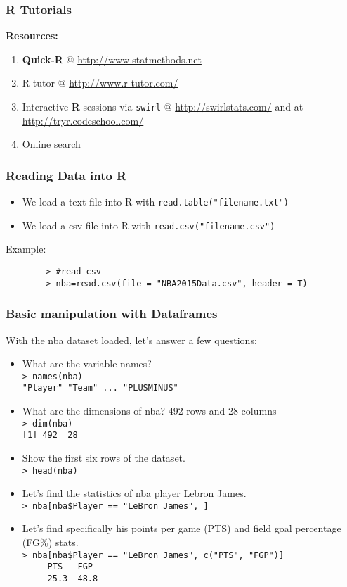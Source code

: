 \documentclass{beamer}
\begin{document}
\begin{frame}[fragile]\frametitle{R Tutorials}
	\textbf{Resources:}
	\begin{enumerate}
		\item \textbf{Quick-R} @ \url{http://www.statmethods.net}
		\item R-tutor @ \url{http://www.r-tutor.com/}
		\item Interactive \textbf{R} sessions via \texttt{swirl} @ \url{http://swirlstats.com/} and at \url{http://tryr.codeschool.com/}
		\item Online search 
	\end{enumerate}	
\end{frame}

\begin{frame}[fragile]\frametitle{Reading Data into R}
	\begin{itemize}
		\item We load a text file into R with \verb|read.table("filename.txt")|
		\item We load a csv file into R with \verb|read.csv("filename.csv")|
	\end{itemize}
	Example:
	\begin{framed}
		\begin{verbatim}
		> #read csv
		> nba=read.csv(file = "NBA2015Data.csv", header = T)
		\end{verbatim}
	\end{framed}
\end{frame}


\begin{frame}[fragile]\frametitle{Basic manipulation with Dataframes}
	With the nba dataset loaded, let's answer a few questions:
\vspace{-10pt}
\small
	\begin{itemize}
		\item What are the variable names?\\
		\verb|> names(nba)|\\
		\verb|"Player" "Team" ... "PLUSMINUS"|
		\item What are the dimensions of nba? 492 rows and 28 columns \\
		\verb|> dim(nba)|\\
		\verb|[1] 492  28|
		\item Show the first six rows of the dataset.\\
		\verb|> head(nba)|
		\item Let's find the statistics of nba player Lebron James.\\
		\verb|> nba[nba$Player == "LeBron James", ]|
		\item Let's find specifically his points per game (PTS) and field goal percentage (FG\%) stats.\\
		\verb|> nba[nba$Player == "LeBron James", c("PTS", "FGP")]|\\
		\verb|     PTS   FGP|\\
		\verb|     25.3  48.8|
	\end{itemize}	
\end{frame}
\end{document}
